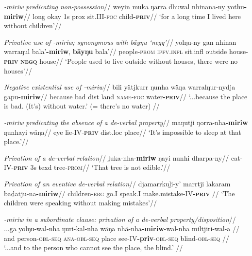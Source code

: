 \a\begingl\glpreamble \textit{\emph{-miriw} predicating non-possession}//
\gla weyin muka ŋarra dhuwal nhinana-ny yothu\textbf{-miriw}//
\glb long okay 1\gls{s} \gls{prox} sit.III-\textsc{foc} child\textsc{\textbf{-priv}}//
\glft`for a long time I lived here without children'//\endgl

\a\begingl\glpreamble \textit{Privative use of \emph{-miriw}; synonymous with \em{bäyŋu} `\gls{negq}'}//
\gla yolŋu-ny gan nhinan warraŋul bala'\textbf{-miriw}, \textbf{bäyŋu} bala'//
\glb people-\textsc{prom} \textsc{ipfv.infl} sit.\gls{infl} outside house\textsc{-\textbf{priv}} \textsc{\textbf{negq}} house//
\glft `People used to live outside without houses, there were no houses'//
\endgl

\a\begingl\glpreamble \textit{Negative existential use of \emph{-miriw}}//
\gla bili yätjkurr ŋunha wäŋa warralŋur-nydja gapu\textbf{-miriw}//
\glb because bad \gls{dist} land \textsc{name-foc} water\textsc{\textbf{-priv}}//
\glft `...because the place is bad. (It's) without water.' (= there's no water) 		//
\endgl

\a\begingl\glpreamble\textit{\emph{-miriw} predicating the absence of a de-verbal property}//
\gla maŋutji ŋorra-nha\textbf{-miriw} ŋunhayi wäŋa//
\glb eye lie-IV\textsc{-\textbf{priv}} \gls{dist}.\gls{loc} place//
\glft`It's impossible to sleep at that place.'//\endgl


\a\begingl\glpreamble \textit{Privation of a de-verbal relation}// %
\gla ḻuka-nha-\textbf{miriw} ŋayi nunhi dharpa-ny//
\glb eat-IV-\textsc{\textbf{priv}} 3s \gls{texd} tree-\textsc{prom}//
\glft`That tree is not edible.'//\endgl


\a\begingl\glpreamble \textit{Privation of an eventive de-verbal relation}//
\gla djamarrkuḻi-y' marrtji lakaram baḏatju-na\textbf{-miriw}//
\glb children-\textsc{erg} go.I speak.I make.mistake-IV\textsc{\textbf{-priv}}	//
\glft `The children were speaking without making mistakes'//\endgl


\a\begingl\glpreamble \textit{\emph{-miriw} in a subordinate clause: privation of a de-verbal property/disposition}//
\gla ...ga yolŋu-wal-nha ŋuri-kal-nha wäŋa nhä-nha\textbf{-miriw}-wal-nha miltjiri-wal-a   //
\glb and person\textsc{-\gls{obl}-seq} \textsc{ana-obl-seq} place see-IV\textbf{-\gls{priv}}-\textsc{obl-seq} blind\textsc{-obl-seq}	//
\glft`...and to the person who cannot see the place, the blind.' 			//\endgl

